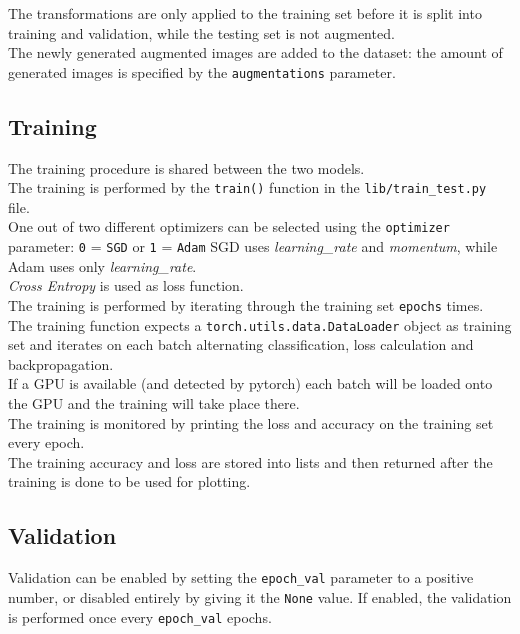 \documentclass{report}
\begin{document}
The transformations are only applied to the training set before it is split into training and validation, while the testing set is not augmented. \\
The newly generated augmented images are added to the dataset: the amount of generated images is specified by the \texttt{augmentations} parameter.\\

\subsection{Training}
The training procedure is shared between the two models. \\
The training is performed by the \texttt{train()} function in the \texttt{lib/train\_test.py} file. \\

One out of two different optimizers can be selected using the \texttt{optimizer} parameter: \texttt{0} = \texttt{SGD} or \texttt{1} = \texttt{Adam}
SGD uses \textit{learning\_rate} and \textit{momentum}, while Adam uses only \textit{learning\_rate}. \\
\textit{Cross Entropy} is used as loss function. \\

The training is performed by iterating through the training set \texttt{epochs} times. \\
The training function expects a \texttt{torch.utils.data.DataLoader} object as training set and iterates on each batch alternating classification, loss calculation and backpropagation.\\

If a GPU is available (and detected by pytorch) each batch will be loaded onto the GPU and the training will take place there. \\
The training is monitored by printing the loss and accuracy on the training set every epoch. \\
The training accuracy and loss are stored into lists and then returned after the training is done to be used for plotting. \\

\subsection{Validation}
Validation can be enabled by setting the \texttt{epoch\_val} parameter to a positive number, or disabled entirely by giving it the \texttt{None} value.
If enabled, the validation is performed once every \texttt{epoch\_val} epochs. \\
\end{document}
